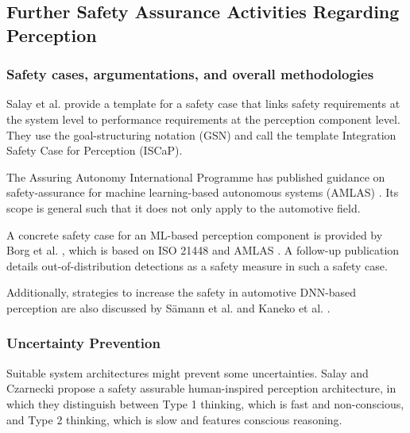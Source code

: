 \documentclass[conference]{IEEEtran}
\newcommand{\new}[1]{{\color{my-red}#1}}
\begin{document}
\subsection{Further Safety Assurance Activities Regarding Perception} 
\label{sec:discussion_other_activities}

\subsubsection{\new{Safety cases, argumentations, and overall methodologies}}

Salay et al. \cite{Salay2021missinglink} provide a template for a safety case that links safety requirements at the system level to performance requirements at the perception component level. 
They use the goal-structuring notation (GSN) and call the template Integration Safety Case for Perception (ISCaP).

The Assuring Autonomy International Programme has published guidance on safety-assurance for machine learning-based autonomous systems (AMLAS) \cite{Hawkins2021amlas}. Its scope is general such that it does not only apply to the automotive field.

A concrete safety case for an ML-based perception component is provided by Borg et al. \cite{Borg2022smirk}, which is based on ISO 21448 and AMLAS \cite{Hawkins2021amlas}.
A follow-up publication \cite{Henriksson2023ood} details out-of-distribution detections as a safety measure in such a safety case.


Additionally, strategies to increase the safety in automotive DNN-based perception are also discussed by Sämann et al. \cite{Saemann2020strategy} and Kaneko et al. \cite{Kaneko2023safety}.


\subsubsection{Uncertainty Prevention}
\label{sec:uncertainty_prevention}

Suitable system architectures might prevent some uncertainties. 
Salay and Czarnecki \cite{Salay2022humaninspired} propose a safety assurable human-inspired perception architecture, in which they distinguish between Type 1 thinking, which is fast and non-conscious, and Type 2 thinking, which is slow and features conscious reasoning. 


\end{document}
